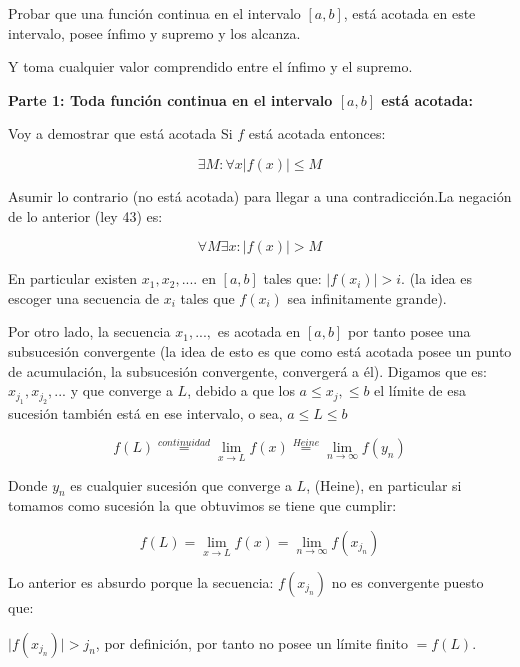 \documentclass[14pt]{extarticle}
\begin{document}
\begin{tcolorbox}[colback=blue!5!white,colframe=blue!75!black, title =Extreme-Value-Theorem-Weiestrass]

    Probar que una función continua en el intervalo $[a,b]$, está acotada en este intervalo, posee ínfimo y supremo y los alcanza. 
\end{tcolorbox}

\begin{tcolorbox}[colback=blue!5!white,colframe=blue!75!black, title = Intermediate-Value-Theorem-Bolzano]

    Y toma cualquier valor comprendido entre el ínfimo y el supremo.
\end{tcolorbox}


\textbf{Parte 1: Toda función continua en el intervalo $[a,b]$ está acotada:} 

Voy a demostrar que está acotada Si $f$ está acotada entonces:

$$\exists M: \forall x   \vert f(x) \vert \leq M$$

Asumir lo contrario (no está acotada) para llegar a una contradicción.La negación de lo anterior (ley 43) es:

$$\forall M \exists x: \vert f(x) \vert > M$$

En particular existen $x_1, x_2, ....$ en $[a,b]$ tales que: $\vert f(x_i) \vert > i$. (la idea es escoger una secuencia de $x_i$ tales que $f(x_i)$ sea infinitamente grande). 

Por otro lado, la secuencia $x_1, ..., $ es acotada en $[a,b]$ por tanto posee una subsucesión convergente (la idea de esto es que como está acotada posee un punto de acumulación, la subsucesión convergente, convergerá a él). Digamos que es: $x_{j_1}, x_{j_2}, ... $ y que converge a $L$, debido a que los $a \leq x_j  ,    \leq b$ el límite de esa sucesión también está en ese intervalo, o sea, $a \leq L \leq b$ 

$$f(L) \stackrel{continuidad}{=}  \lim_{x \to L} f(x) \stackrel{Heine}{=}  \lim_{n \to \infty} f(y_n)$$

Donde $y_n$ es cualquier sucesión que converge a $L$, (Heine), en particular si tomamos como sucesión la que obtuvimos se tiene que cumplir:

$$f(L) =  \lim_{x \to L} f(x) =  \lim_{n \to \infty} f(x_{j_n})$$

Lo anterior es absurdo porque la secuencia: $f(x_{j_n}) $ no es convergente puesto que:

$\vert f(x_{j_n}) \vert > j_n$, por definición, por tanto no posee un límite finito $ = f(L)$.
\end{document}
